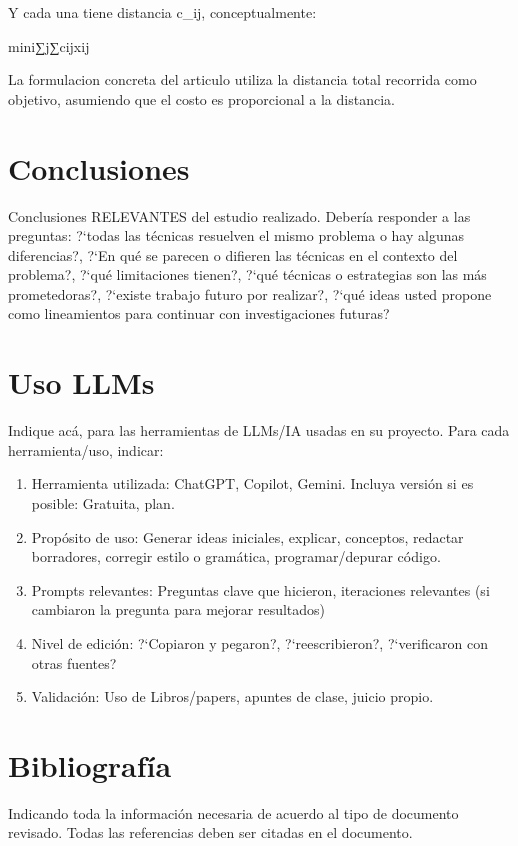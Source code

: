 \documentclass[letter, 10pt]{article}
\begin{document}
Y cada una tiene distancia c_ij, conceptualmente:

mini∑​j∑​cij​xij​

La formulacion concreta del articulo utiliza la distancia total recorrida como objetivo, asumiendo que el costo es proporcional a la distancia.

\section{Conclusiones}
Conclusiones RELEVANTES del estudio realizado. Deber\'ia responder a las preguntas: ?`todas las t\'ecnicas resuelven el mismo problema o hay algunas diferencias?, ?`En qu\'e se parecen o difieren las t\'ecnicas en el contexto del problema?, ?`qu\'e limitaciones tienen?, ?`qu\'e t\'ecnicas o estrategias son las m\'as prometedoras?, ?`existe trabajo futuro por realizar?, ?`qu\'e ideas usted propone como lineamientos para continuar con investigaciones futuras?

\section{Uso LLMs}
Indique ac\'a, para las herramientas de LLMs/IA usadas en su proyecto. Para cada herramienta/uso, indicar:
\begin{enumerate}
\item Herramienta utilizada: ChatGPT, Copilot, Gemini. Incluya versi\'on si es posible: Gratuita, plan.
\item Prop\'osito de uso: Generar ideas iniciales, explicar,  conceptos, redactar borradores, corregir estilo o gram\'atica, programar/depurar c\'odigo.
\item Prompts relevantes: Preguntas clave que hicieron, iteraciones relevantes (si cambiaron la pregunta para mejorar resultados)
\item Nivel de edici\'on: ?`Copiaron y pegaron?, ?`reescribieron?, ?`verificaron con otras fuentes?
\item Validaci\'on: Uso de Libros/papers, apuntes de clase, juicio propio.
\end{enumerate}


\section{Bibliograf\'ia}
Indicando toda la informaci\'on necesaria de acuerdo al tipo de documento revisado. Todas las referencias deben ser citadas en el documento.


\end{document}
